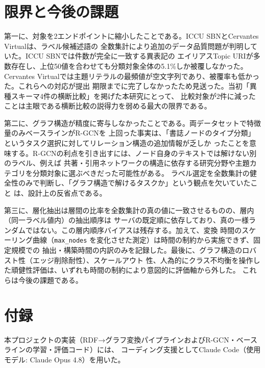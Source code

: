 \documentclass[dvipdfmx,twoside,11pt]{article}
\begin{document}
\section{限界と今後の課題}
\label{sec:limitation}

第一に、対象を2エンドポイントに縮小したことである。ICCU SBNとCervantes Virtualは、ラベル候補述語の
全数集計により追加のデータ品質問題が判明していた。ICCU SBNでは件数が完全に一致する異表記の
エイリアスTopic URIが多数存在し、上位50値を合わせても分類対象全体の5.1\%しか被覆しなかった。
Cervantes Virtualでは主題リテラルの最頻値が空文字列であり、被覆率も低かった。これらへの対応が提出
期限までに完了しなかったため見送った。当初「異種スキーマ4件の横断比較」を掲げた本研究にとって、
比較対象が2件に減ったことは主眼である横断比較の説得力を弱める最大の限界である。

第二に、グラフ構造が精度に寄与しなかったことである。両データセットで特徴量のみベースラインがR-GCNを
上回った事実は、「書誌ノードのタイプ分類」というタスク選択に対してリレーション構造の追加情報が乏しか
ったことを意味する。R-GCNの利点を引き出すには、ノード自身のテキストでは解けない別のラベル、例えば
共著・引用ネットワークの構造に依存する研究分野や主題カテゴリを分類対象に選ぶべきだった可能性がある。
ラベル選定を全数集計の健全性のみで判断し、「グラフ構造で解けるタスクか」という観点を欠いていたこと
は、設計上の反省点である。

第三に、層化抽出は層間の比率を全数集計の真の値に一致させるものの、層内（同一ラベル値内）の抽出順序は
サーバの既定順に依存しており、真の一様ランダムではない。この層内順序バイアスは残存する。加えて、変換
時間のスケーリング曲線（\texttt{max\_nodes} を変化させた測定）は時間の制約から実施できず、固定規模での
抽出・構築時間の内訳のみを記録した。最後に、グラフ構造のロバスト性（エッジ削除耐性）、スケールアウト
性、人為的にクラス不均衡を操作した頑健性評価は、いずれも時間の制約により意図的に評価軸から外した。
これらは今後の課題である。

\section*{付録}

本プロジェクトの実装（RDF→グラフ変換パイプラインおよびR-GCN・ベースラインの学習・評価コード）には、
コーディング支援としてClaude Code（使用モデル: Claude Opus 4.8）を用いた。

\vskip 0.2in

\end{document}
